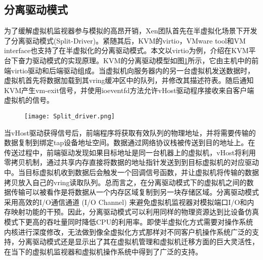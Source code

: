\subsection{分离驱动模式}
为了缓解虚拟机监视器参与模拟的高昂开销，Xen团队首先在半虚拟化场景下开发了分离驱动模式(Split-Driver)\citen{}。紧随其后，KVM的virtio\citen{}，VMware tool和VM interface\citen{}也支持了在半虚拟化的分离驱动模式。本文以virtio为例，介绍在KVM平台下奋力驱动模式的实现原理。KVM的分离驱动模型如图\ref{fig:split_dri}所示，它由主机中的前端virtio驱动和后端驱动组成。当虚拟机向服务器内的另一台虚拟机发送数据时，虚拟机首先将数据加载到其vring缓冲区中的队列，并修改其描述符表。随后通知KVM产生vm-exit信号，并使用ioeventfd方法允许vHost驱动程序接收来自客户端虚拟机的信号。
\begin{figure}[!htp]
	\label{fig:split_dri}
	\centering
	\texttt{[image: Split\_driver.png]}
\end{figure}
当vHost驱动获得信号后，前端程序将获取有效队列的物理地址，并将需要传输的数据复制到绑定tap设备地址空间。数据通过网络协议栈被传送到目的地址上。在传送过程中，前端驱动发现如果目标地址是同一台机器上的虚拟机，vHost将利用零拷贝机制，通过共享内存直接将数据的地址指针发送到到目标虚拟机的对应驱动中。当目标虚拟机收到数据后会触发一个回调信号函数，并让虚拟机将传输的数据拷贝放入自己的vring读取队列。总而言之，在分离驱动模式下的虚拟机之间的数据传输可以被看作是将数据从一个内存区域复制到另一块存储区域。分离驱动模式采用高效的I/O通信通道 (I/O Channel) 来避免虚拟机监视器对模拟端口I/O和内存映射功能的干预。因此，分离驱动模式可以利用同样的物理资源达到比设备仿真模式下更高的吞吐量同时降低CPU的利用率。即使半虚拟化方式需要对操作系统内核进行深度修改，无法做到像全虚拟化方式那样对不同客户机操作系统广泛的支持，分离驱动模式还是显示出了其在虚拟机管理和虚拟机迁移方面的巨大灵活性，在当下的虚拟机监视器和虚拟机操作系统中得到了广泛的支持。


